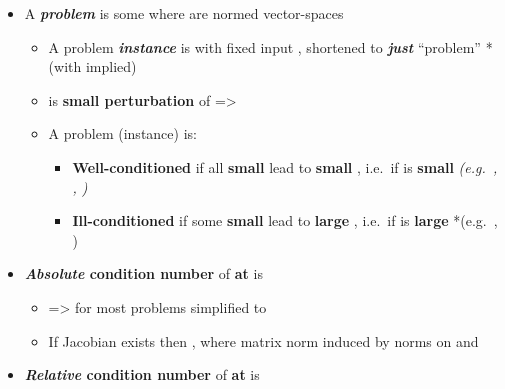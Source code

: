 \begin{itemize}

  \item
        A \textbf{\emph{problem}} is some  where 
        are normed vector-spaces

        \begin{itemize}

          \item
                A problem \textbf{\emph{instance}} is  with fixed input
                , shortened to \textbf{\emph{just}} ``problem''
                *(with  implied)
          \item
                 is \textbf{small perturbation} of 
                =\textgreater{} 
          \item
                A problem (instance) is:

                \begin{itemize}

                  \item
                        \textbf{Well-conditioned} if all \textbf{small} 
                        lead to \textbf{small} , i.e.~if \iMbox{\kappa} is
                        \textbf{small} \emph{(e.g.~, , )}
                  \item
                        \textbf{Ill-conditioned} if some \textbf{small} 
                        lead to \textbf{large} , i.e.~if \iMbox{\kappa} is
                        \textbf{large} *(e.g.~, )
                \end{itemize}
        \end{itemize}
  \item
        \textbf{\emph{Absolute} condition number}
         of
        \textbf{ at } is

        \begin{itemize}

          \item
                =\textgreater{} for most problems simplified to
          \item
                If Jacobian  exists then
                , where
                matrix norm \iMbox{\lVert - \rVert} induced by norms on 
                and 
        \end{itemize}
  \item
        \textbf{\emph{Relative} condition number}
         of \textbf{ at } is


\end{itemize}
